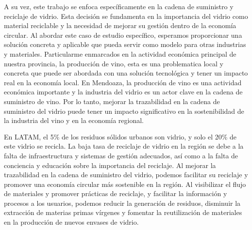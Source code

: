 \documentclass[main.tex]{subfiles}
\begin{document}
A su vez, este trabajo se enfoca específicamente en la cadena de suministro y reciclaje de vidrio. Esta decisión se fundamenta en la importancia del vidrio como material reciclable y la necesidad de mejorar su gestión dentro de la economía circular. Al abordar este caso de estudio específico, esperamos proporcionar una solución concreta y aplicable que pueda servir como modelo para otras industrias y materiales. Particularme enmarcados en la actividad económica principal de nuestra provincia, la producción de vino, esta es una problematica local y concreta que puede ser abordada con una solución tecnológica y tener un impacto real en la economía local. En Mendoaza, la producción de vino es una actividad económica importante y la industria del vidrio es un actor clave en la cadena de suministro de vino. Por lo tanto, mejorar la trazabilidad en la cadena de suministro del vidrio puede tener un impacto significativo en la sostenibilidad de la industria del vino y en la economía regional.

En LATAM, el 5\% de los residuos sólidos urbanos son vidrio, y solo el 20\% de este vidrio se recicla. La baja tasa de reciclaje de vidrio en la región se debe a la falta de infraestructura y sistemas de gestión adecuados, así como a la falta de conciencia y educación sobre la importancia del reciclaje. Al mejorar la trazabilidad en la cadena de suministro del vidrio, podemos facilitar su reciclaje y promover una economía circular más sostenible en la región. Al visibilizar el flujo de materiales y promover prácticas de reciclaje, y facilitar la información y procesos a los usuarios, podemos reducir la generación de residuos, disminuir la extracción de materias primas vírgenes y fomentar la reutilización de materiales en la producción de nuevos envases de vidrio.
\end{document}
